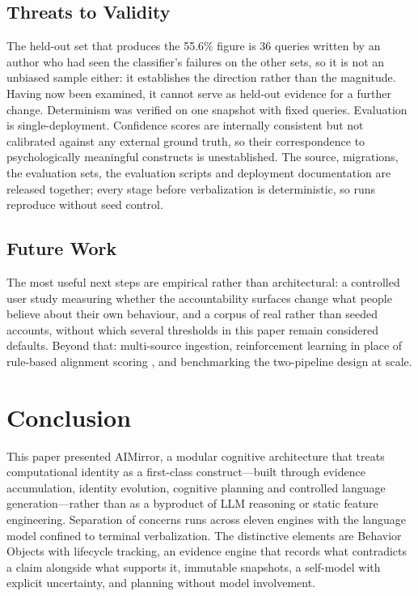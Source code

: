 \documentclass[conference]{IEEEtran}
\begin{document}
\subsection{Threats to Validity}
The held-out set that produces the 55.6\% figure is 36 queries written by an author who had seen the classifier's failures on the other sets, so it is not an unbiased sample either: it establishes the direction rather than the magnitude. Having now been examined, it cannot serve as held-out evidence for a further change. Determinism was verified on one snapshot with fixed queries. Evaluation is single-deployment. Confidence scores are internally consistent but not calibrated against any external ground truth, so their correspondence to psychologically meaningful constructs is unestablished. The source, migrations, the evaluation sets, the evaluation scripts and deployment documentation are released together; every stage before verbalization is deterministic, so runs reproduce without seed control.

\subsection{Future Work}
The most useful next steps are empirical rather than architectural: a controlled user study measuring whether the accountability surfaces change what people believe about their own behaviour, and a corpus of real rather than seeded accounts, without which several thresholds in this paper remain considered defaults. Beyond that: multi-source ingestion, reinforcement learning in place of rule-based alignment scoring \cite{schulman2017}, and benchmarking the two-pipeline design at scale.

\section{Conclusion}
\label{sec:conclusion}

This paper presented AIMirror, a modular cognitive architecture that treats computational identity as a first-class construct---built through evidence accumulation, identity evolution, cognitive planning and controlled language generation---rather than as a byproduct of LLM reasoning or static feature engineering. Separation of concerns runs across eleven engines with the language model confined to terminal verbalization. The distinctive elements are Behavior Objects with lifecycle tracking, an evidence engine that records what contradicts a claim alongside what supports it, immutable snapshots, a self-model with explicit uncertainty, and planning without model involvement.
\end{document}
